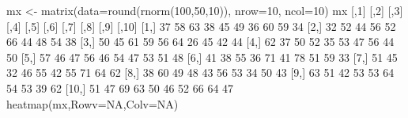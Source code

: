 \documentclass[
]{book}
\newenvironment{Shaded}{\begin{snugshade}}{\end{snugshade}}
\newcommand{\AttributeTok}[1]{\textcolor[rgb]{0.77,0.63,0.00}{#1}}
\newcommand{\ConstantTok}[1]{\textcolor[rgb]{0.00,0.00,0.00}{#1}}
\newcommand{\DecValTok}[1]{\textcolor[rgb]{0.00,0.00,0.81}{#1}}
\newcommand{\FunctionTok}[1]{\textcolor[rgb]{0.00,0.00,0.00}{#1}}
\newcommand{\NormalTok}[1]{#1}
\newcommand{\OtherTok}[1]{\textcolor[rgb]{0.56,0.35,0.01}{#1}}
\begin{document}
\begin{Shaded}
\begin{Highlighting}[]
\NormalTok{mx }\OtherTok{\textless{}{-}} \FunctionTok{matrix}\NormalTok{(}\AttributeTok{data=}\FunctionTok{round}\NormalTok{(}\FunctionTok{rnorm}\NormalTok{(}\DecValTok{100}\NormalTok{,}\DecValTok{50}\NormalTok{,}\DecValTok{10}\NormalTok{)),}
             \AttributeTok{nrow=}\DecValTok{10}\NormalTok{,}
             \AttributeTok{ncol=}\DecValTok{10}\NormalTok{)}
\NormalTok{mx}
\NormalTok{      [,}\DecValTok{1}\NormalTok{] [,}\DecValTok{2}\NormalTok{] [,}\DecValTok{3}\NormalTok{] [,}\DecValTok{4}\NormalTok{] [,}\DecValTok{5}\NormalTok{] [,}\DecValTok{6}\NormalTok{] [,}\DecValTok{7}\NormalTok{] [,}\DecValTok{8}\NormalTok{] [,}\DecValTok{9}\NormalTok{] [,}\DecValTok{10}\NormalTok{]}
\NormalTok{ [}\DecValTok{1}\NormalTok{,]   }\DecValTok{37}   \DecValTok{58}   \DecValTok{63}   \DecValTok{38}   \DecValTok{45}   \DecValTok{49}   \DecValTok{36}   \DecValTok{60}   \DecValTok{59}    \DecValTok{34}
\NormalTok{ [}\DecValTok{2}\NormalTok{,]   }\DecValTok{32}   \DecValTok{52}   \DecValTok{44}   \DecValTok{56}   \DecValTok{52}   \DecValTok{66}   \DecValTok{44}   \DecValTok{48}   \DecValTok{54}    \DecValTok{38}
\NormalTok{ [}\DecValTok{3}\NormalTok{,]   }\DecValTok{50}   \DecValTok{45}   \DecValTok{61}   \DecValTok{59}   \DecValTok{56}   \DecValTok{64}   \DecValTok{26}   \DecValTok{45}   \DecValTok{42}    \DecValTok{44}
\NormalTok{ [}\DecValTok{4}\NormalTok{,]   }\DecValTok{62}   \DecValTok{37}   \DecValTok{50}   \DecValTok{52}   \DecValTok{35}   \DecValTok{53}   \DecValTok{47}   \DecValTok{56}   \DecValTok{44}    \DecValTok{50}
\NormalTok{ [}\DecValTok{5}\NormalTok{,]   }\DecValTok{57}   \DecValTok{46}   \DecValTok{47}   \DecValTok{56}   \DecValTok{46}   \DecValTok{54}   \DecValTok{47}   \DecValTok{53}   \DecValTok{51}    \DecValTok{48}
\NormalTok{ [}\DecValTok{6}\NormalTok{,]   }\DecValTok{41}   \DecValTok{38}   \DecValTok{55}   \DecValTok{36}   \DecValTok{71}   \DecValTok{41}   \DecValTok{78}   \DecValTok{51}   \DecValTok{59}    \DecValTok{33}
\NormalTok{ [}\DecValTok{7}\NormalTok{,]   }\DecValTok{51}   \DecValTok{45}   \DecValTok{32}   \DecValTok{46}   \DecValTok{55}   \DecValTok{42}   \DecValTok{55}   \DecValTok{71}   \DecValTok{64}    \DecValTok{62}
\NormalTok{ [}\DecValTok{8}\NormalTok{,]   }\DecValTok{38}   \DecValTok{60}   \DecValTok{49}   \DecValTok{48}   \DecValTok{43}   \DecValTok{56}   \DecValTok{53}   \DecValTok{34}   \DecValTok{50}    \DecValTok{43}
\NormalTok{ [}\DecValTok{9}\NormalTok{,]   }\DecValTok{63}   \DecValTok{51}   \DecValTok{42}   \DecValTok{53}   \DecValTok{53}   \DecValTok{64}   \DecValTok{54}   \DecValTok{53}   \DecValTok{39}    \DecValTok{62}
\NormalTok{[}\DecValTok{10}\NormalTok{,]   }\DecValTok{51}   \DecValTok{47}   \DecValTok{69}   \DecValTok{63}   \DecValTok{50}   \DecValTok{46}   \DecValTok{52}   \DecValTok{66}   \DecValTok{64}    \DecValTok{47}
\FunctionTok{heatmap}\NormalTok{(mx,}\AttributeTok{Rowv=}\ConstantTok{NA}\NormalTok{,}\AttributeTok{Colv=}\ConstantTok{NA}\NormalTok{)}
\end{Highlighting}
\end{Shaded}
\end{document}
